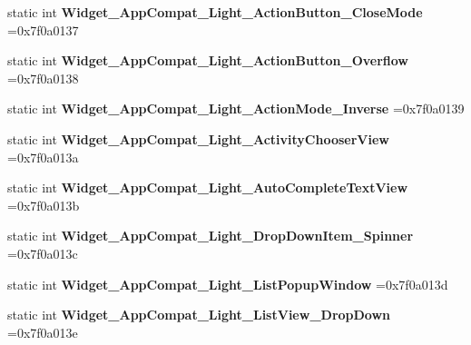 \begin{DoxyCompactItemize}
static int {\bfseries Widget\+\_\+\+App\+Compat\+\_\+\+Light\+\_\+\+Action\+Button\+\_\+\+Close\+Mode} =0x7f0a0137
\item 
\mbox{\label{classandroid_1_1support_1_1v7_1_1mediarouter_1_1R_1_1style_acdd96db248e7eaf069a8c794989b0586}} 
static int {\bfseries Widget\+\_\+\+App\+Compat\+\_\+\+Light\+\_\+\+Action\+Button\+\_\+\+Overflow} =0x7f0a0138
\item 
\mbox{\label{classandroid_1_1support_1_1v7_1_1mediarouter_1_1R_1_1style_a1abd5f650a6837a105d8d34c47d8dc7d}} 
static int {\bfseries Widget\+\_\+\+App\+Compat\+\_\+\+Light\+\_\+\+Action\+Mode\+\_\+\+Inverse} =0x7f0a0139
\item 
\mbox{\label{classandroid_1_1support_1_1v7_1_1mediarouter_1_1R_1_1style_afcad63468ec9318af0bac2c051da7baf}} 
static int {\bfseries Widget\+\_\+\+App\+Compat\+\_\+\+Light\+\_\+\+Activity\+Chooser\+View} =0x7f0a013a
\item 
\mbox{\label{classandroid_1_1support_1_1v7_1_1mediarouter_1_1R_1_1style_ac6e025a63b0d7b9d2363e84053710118}} 
static int {\bfseries Widget\+\_\+\+App\+Compat\+\_\+\+Light\+\_\+\+Auto\+Complete\+Text\+View} =0x7f0a013b
\item 
\mbox{\label{classandroid_1_1support_1_1v7_1_1mediarouter_1_1R_1_1style_a8790d3e339ea25d42da71147891ae2b0}} 
static int {\bfseries Widget\+\_\+\+App\+Compat\+\_\+\+Light\+\_\+\+Drop\+Down\+Item\+\_\+\+Spinner} =0x7f0a013c
\item 
\mbox{\label{classandroid_1_1support_1_1v7_1_1mediarouter_1_1R_1_1style_a6ace1810d7ce4d47b81dde475ab67d6f}} 
static int {\bfseries Widget\+\_\+\+App\+Compat\+\_\+\+Light\+\_\+\+List\+Popup\+Window} =0x7f0a013d
\item 
\mbox{\label{classandroid_1_1support_1_1v7_1_1mediarouter_1_1R_1_1style_aafdd560bc6a7a78146948748a7362bdd}} 
static int {\bfseries Widget\+\_\+\+App\+Compat\+\_\+\+Light\+\_\+\+List\+View\+\_\+\+Drop\+Down} =0x7f0a013e

\end{DoxyCompactItemize}
